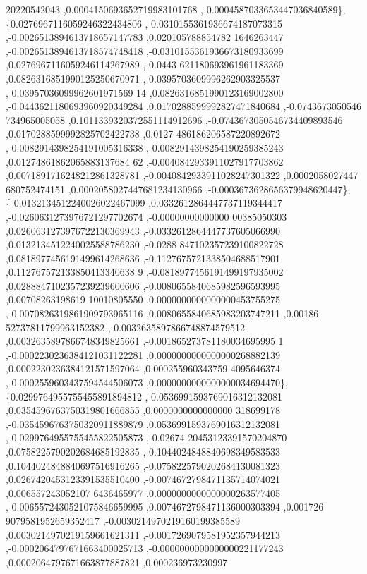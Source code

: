\begin{DoxyCode}
      20220542043 ,0.0004150693652719983101768 ,-0.0004587033653447036840589\},
\{0.0276967116059246322434806 ,-0.0310155361936674187073315 ,-0.0026513894613718657147783 ,0.020105788854782
      1646263447 ,-0.0026513894613718574748418 ,-0.0310155361936673180933699 ,0.0276967116059246114267989 ,-0.0443
      621180693961961183369 ,0.0826316851990125250670971 ,-0.0395703609996262903325537 ,-0.03957036099962601971569
      14 ,0.0826316851990123169002800 ,-0.0443621180693960920349284 ,0.0170288599992827471840684 ,-0.0743673050546
      734965005058 ,0.1011339320372551114912696 ,-0.0743673050546734409893546 ,0.0170288599992825702422738 ,0.0127
      486186206587220892672 ,-0.0082914398254191005316338 ,-0.0082914398254190259385243 ,0.01274861862065883137684
      62 ,-0.0040842933911027917703862 ,0.0071891716248212861328781 ,-0.0040842933911028247301322 ,0.0002058027447
      680752474151 ,0.0002058027447681234130966 ,-0.0003673628656379948620447\},
\{-0.0132134512240026022467099 ,0.0332612864447737119344417 ,-0.0260631273976721297702674 ,-0.00000000000000
      00385050303 ,0.0260631273976722130369943 ,-0.0332612864447737605066990 ,0.0132134512240025588786230 ,-0.0288
      847102357239100822728 ,0.0818977456191499614268636 ,-0.1127675721338504688517901 ,0.112767572133850413340638
      9 ,-0.0818977456191499197935002 ,0.0288847102357239239600606 ,-0.0080655840685982596593995 ,0.00708263198619
      10010805550 ,0.0000000000000000453755275 ,-0.0070826319861909793965116 ,0.0080655840685983203747211 ,0.00186
      52737811799963152382 ,-0.0032635897866748874579512 ,0.0032635897866748349825661 ,-0.001865273781180034695995
      1 ,-0.0002230236384121031122281 ,0.0000000000000000268882139 ,0.0002230236384121571597064 ,0.000255960343759
      4095646374 ,-0.0002559603437594544506073 ,0.0000000000000000034694470\},
\{0.0299764955755455891894812 ,-0.0536991593769016312132081 ,0.0354596763750319801666855 ,0.0000000000000000
      318699178 ,-0.0354596763750320911889879 ,0.0536991593769016312132081 ,-0.0299764955755455822505873 ,-0.02674
      20453123391570204870 ,0.0758225790202684685192835 ,-0.1044024848840698349583533 ,0.1044024848840697516916265
       ,-0.0758225790202684130081323 ,0.0267420453123391535510400 ,-0.0074672798471135714074021 ,0.006557243052107
      6436465977 ,0.0000000000000000263577405 ,-0.0065572430521075846659995 ,0.0074672798471136000303394 ,0.001726
      9079581952659352417 ,-0.0030214970219160199385589 ,0.0030214970219159661621311 ,-0.0017269079581952357944213
       ,-0.0002064797671663400025713 ,-0.0000000000000000221177243 ,0.0002064797671663877887821 ,0.000236973230997

\end{DoxyCode}
